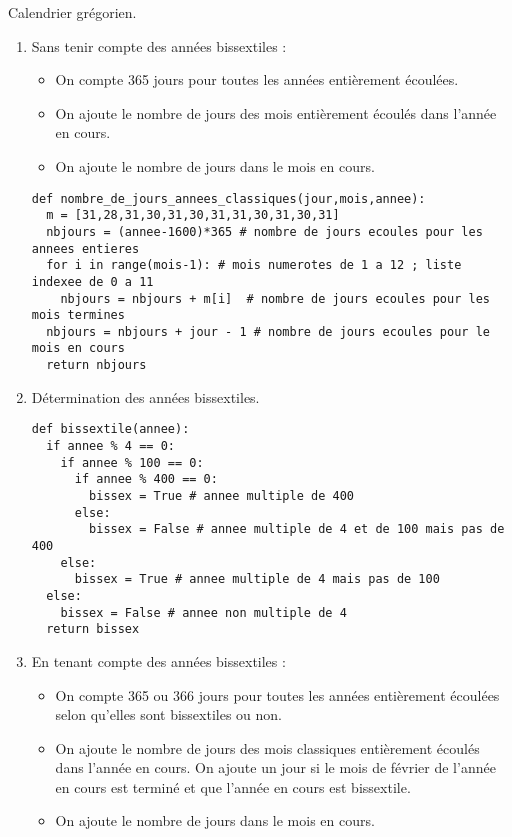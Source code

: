 \begin{solution}Calendrier grégorien.

\begin{enumerate}
 \item Sans tenir compte des années bissextiles :
 \begin{itemize}
  \item On compte 365 jours pour toutes les années entièrement écoulées. 
  \item On ajoute le nombre de jours des mois entièrement écoulés dans l'année en cours. 
  \item On ajoute le nombre de jours dans le mois en cours.                                                                                                                                                                                                           \end{itemize}

\begin{verbatim}
def nombre_de_jours_annees_classiques(jour,mois,annee):
  m = [31,28,31,30,31,30,31,31,30,31,30,31]
  nbjours = (annee-1600)*365 # nombre de jours ecoules pour les annees entieres
  for i in range(mois-1): # mois numerotes de 1 a 12 ; liste indexee de 0 a 11
    nbjours = nbjours + m[i]  # nombre de jours ecoules pour les mois termines
  nbjours = nbjours + jour - 1 # nombre de jours ecoules pour le mois en cours
  return nbjours
\end{verbatim}

 \item Détermination des années bissextiles.

\begin{verbatim}
def bissextile(annee):
  if annee % 4 == 0:
    if annee % 100 == 0:
      if annee % 400 == 0: 
        bissex = True # annee multiple de 400
      else:
        bissex = False # annee multiple de 4 et de 100 mais pas de 400
    else:
      bissex = True # annee multiple de 4 mais pas de 100
  else:
    bissex = False # annee non multiple de 4
  return bissex
\end{verbatim}

 \item En tenant compte des années bissextiles :
 \begin{itemize}
  \item On compte 365 ou 366 jours pour toutes les années entièrement écoulées selon qu'elles sont bissextiles ou non. 
  \item On ajoute le nombre de jours des mois classiques entièrement écoulés dans l'année en cours. On ajoute un jour si le mois de février de l'année en cours est terminé et que l'année en cours est bissextile.
  \item On ajoute le nombre de jours dans le mois en cours.
  \end{itemize}


\end{enumerate}
\end{solution}
